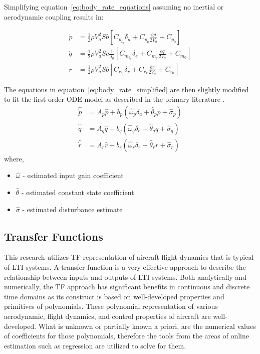 Simplifying equation~\ref{eq:body_rate_equations} assuming no inertial or aerodynamic coupling results in:

\begin{equation}\label{eq:body_rate_simplified}
\begin{split}
	\dot{p}&=\frac{1}{2}\rho V_a^2Sb\left[C_{p_{\delta_a}}\delta_a+C_{p_p}\frac{bp}{2V_a}+C_{p_0}\right]\\
	\dot{q}&=\frac{1}{2}\rho V_a^2Sc\frac{1}{J_y}\left[C_{m_{\delta_e}}\delta_e+C_{m_q}\frac{cq}{2V_a}+C_{m_0}\right]\\
	\dot{r}&=\frac{1}{2}\rho V_a^2Sb\left[C_{r_{\delta_r}}\delta_r+C_{r_r}\frac{br}{2V_a}+C_{r_0}\right]
\end{split}	
\end{equation}

The equations in equation~\ref{eq:body_rate_simplified} are then slightly modified to fit the first order \ac{ODE} model as described in the primary literature \cite{hovakimyan2010l1}.
\begin{equation}
\begin{split}
\hat{\dot{p}}&=A_p\hat{p}+b_p\left(\hat{\omega}_p\delta_a+\hat{\theta}_pp+\hat{\sigma}_p\right)\\
\hat{\dot{q}}&=A_q\hat{q}+b_q\left(\hat{\omega}_q\delta_e+\hat{\theta}_qq+\hat{\sigma}_q\right)\\
\hat{\dot{r}}&=A_r\hat{r}+b_r\left(\hat{\omega}_r\delta_r+\hat{\theta}_rr+\hat{\sigma}_r\right)
\end{split}
\end{equation}
where,
\begin{itemize}
	\item[] $\hat{\omega}$ - estimated input gain coefficient
	\item[] $\hat{\theta}$ - estimated constant state coefficient
	\item[] $\hat{\sigma}$ - estimated disturbance estimate
\end{itemize}

\subsection{Transfer Functions}
This research utilizes \ac{TF} representation of aircraft flight dynamics that is typical of \ac{LTI} systems.  A transfer function is a very effective approach to describe the relationship between inputs and outputs of \ac{LTI} systems.  Both analytically and numerically, the \ac{TF} approach has significant benefits in continuous and discrete time domains as its construct is based on well-developed properties and primitives of polynomials.  These polynomial representation of various aerodynamic, flight dynamics, and control properties of aircraft are well-developed.  What is unknown or partially known a priori, are the numerical values  of coefficients for those polynomials, therefore the tools from the areas of online estimation such as regression are utilized to solve for them.

